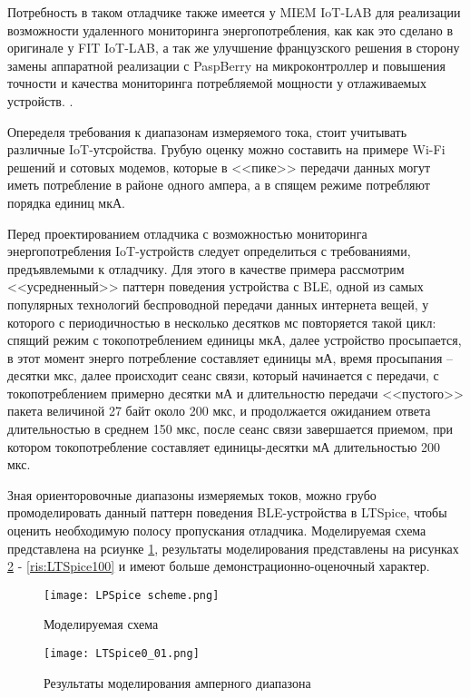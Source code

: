 Потребность в таком отладчике также имеется у MIEM IoT-LAB для реализации возможности удаленного 
мониторинга энергопотребления, как как это сделано в оригинале у FIT IoT-LAB, а так же улучшение 
французского решения в сторону замены аппаратной реализации с PaspBerry на микроконтроллер и повышения 
точности и качества мониторинга потребляемой мощности у отлаживаемых устройств. \cite{FITIoT}.

Опеределя требования к диапазонам измеряемого тока, стоит учитывать различные IoT-утсройства. Грубую оценку
можно составить на примере Wi-Fi решений и сотовых модемов, которые в <<пике>> передачи данных могут 
иметь потребление в районе одного ампера, а в спящем режиме потребляют порядка единиц мкА.


Перед проектированием отладчика с возможностью мониторинга энергопотребления IoT-устройств
следует определиться с требованиями, предъявлемыми к отладчику. 
Для этого в качестве примера рассмотрим <<усредненный>> паттерн поведения устройства с BLE, одной
из самых популярных технологий беспроводной передачи данных интернета вещей, 
у которого с периодичностью в несколько десятков мс повторяется такой цикл: спящий режим 
с токопотреблением единицы мкА, далее устройство просыпается, в этот момент
энерго потребление составляет единицы мА, время просыпания -- десятки мкс, далее происходит
сеанс связи, который начинается с передачи, с токопотреблением примерно десятки мА 
и длительностю передачи <<пустого>> пакета величиной 27 байт около 200 мкс, и продолжается 
ожиданием ответа длительностью в среднем 150 мкс, после сеанс связи завершается приемом,
при котором токопотребление составляет единицы-десятки мА длительностью 200 мкс.

Зная ориенторовочные диапазоны измеряемых токов, можно грубо промоделировать данный паттерн 
поведения BLE-устройства в LTSpice, чтобы оценить необходимую полосу пропускания отладчика. 
Моделируемая схема представлена на рсиунке \ref{ris:LTSpiceScheme}, результаты моделирования 
представлены на рисунках \ref{ris:LTSpice0_01} - \ref{ris:LTSpice100} и имеют больше 
демонстрационно-оценочный характер.

\begin{figure}[H]
  \centering
  \texttt{[image: LPSpice scheme.png]}
  \caption{Моделируемая схема}
  \label{ris:LTSpiceScheme}
\end{figure}

\begin{figure}[H]
  \centering
  \texttt{[image: LTSpice0\_01.png]}
  \caption{Результаты моделирования амперного диапазона }
  \label{ris:LTSpice0_01}
\end{figure}

